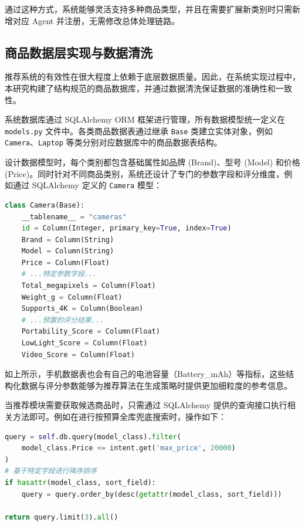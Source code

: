\documentclass{nkuthesis}
\begin{document}
通过这种方式，系统能够灵活支持多种商品类型，并且在需要扩展新类别时只需新增对应 Agent 并注册，无需修改总体处理链路。

\subsection{商品数据层实现与数据清洗}

推荐系统的有效性在很大程度上依赖于底层数据质量。因此，在系统实现过程中，本研究构建了结构规范的商品数据库，并通过数据清洗保证数据的准确性和一致性。

系统数据库通过 SQLAlchemy ORM 框架进行管理，所有数据模型统一定义在 \texttt{models.py} 文件中。各类商品数据表通过继承 \texttt{Base} 类建立实体对象，例如 \texttt{Camera}、\texttt{Laptop} 等类分别对应数据库中的商品数据表结构。

设计数据模型时，每个类别都包含基础属性如品牌 (Brand)、型号 (Model) 和价格 (Price)。同时针对不同商品类别，系统还设计了专门的参数字段和评分维度，例如通过 SQLAlchemy 定义的 \texttt{Camera} 模型：

\begin{lstlisting}[language=Python, caption={数据模型定义（片段，摘自 models.py）}]
class Camera(Base):
    __tablename__ = "cameras"
    id = Column(Integer, primary_key=True, index=True)
    Brand = Column(String)
    Model = Column(String)
    Price = Column(Float)
    # ...特定参数字段...
    Total_megapixels = Column(Float)
    Weight_g = Column(Float)
    Supports_4K = Column(Boolean)
    # ...预置的评分结果...
    Portability_Score = Column(Float)
    LowLight_Score = Column(Float)
    Video_Score = Column(Float)
\end{lstlisting}

如上所示，手机数据表也会有自己的电池容量（Battery\_mAh）等指标，这些结构化数据与评分参数能够为推荐算法在生成策略时提供更加细粒度的参考信息。

当推荐模块需要获取候选商品时，只需通过 SQLAlchemy 提供的查询接口执行相关方法即可。例如在进行按预算全库兜底搜索时，操作如下：

\begin{lstlisting}[language=Python, caption={数据库查询过滤（片段，摘自 electronics\_agents.py）}]
query = self.db.query(model_class).filter(
    model_class.Price <= intent.get('max_price', 20000)
)
# 基于特定字段进行降序排序
if hasattr(model_class, sort_field):
    query = query.order_by(desc(getattr(model_class, sort_field)))

return query.limit(3).all()
\end{lstlisting}
\end{document}
